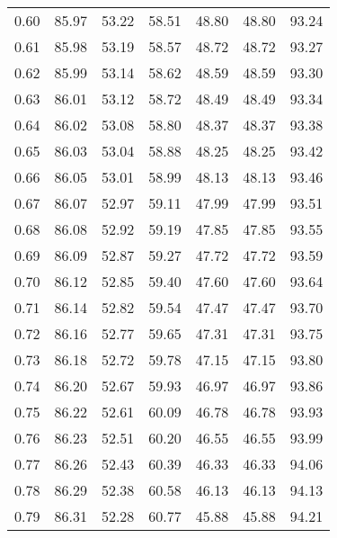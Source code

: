 \begin{tabular}{|c|c|c|c|c|c|c|}
      0.60 &     85.97 &     53.22 &      58.51 &   48.80 &      48.80 &         93.24 \\
      0.61 &     85.98 &     53.19 &      58.57 &   48.72 &      48.72 &         93.27 \\
      0.62 &     85.99 &     53.14 &      58.62 &   48.59 &      48.59 &         93.30 \\
      0.63 &     86.01 &     53.12 &      58.72 &   48.49 &      48.49 &         93.34 \\
      0.64 &     86.02 &     53.08 &      58.80 &   48.37 &      48.37 &         93.38 \\
      0.65 &     86.03 &     53.04 &      58.88 &   48.25 &      48.25 &         93.42 \\
      0.66 &     86.05 &     53.01 &      58.99 &   48.13 &      48.13 &         93.46 \\
      0.67 &     86.07 &     52.97 &      59.11 &   47.99 &      47.99 &         93.51 \\
      0.68 &     86.08 &     52.92 &      59.19 &   47.85 &      47.85 &         93.55 \\
      0.69 &     86.09 &     52.87 &      59.27 &   47.72 &      47.72 &         93.59 \\
      0.70 &     86.12 &     52.85 &      59.40 &   47.60 &      47.60 &         93.64 \\
      0.71 &     86.14 &     52.82 &      59.54 &   47.47 &      47.47 &         93.70 \\
      0.72 &     86.16 &     52.77 &      59.65 &   47.31 &      47.31 &         93.75 \\
      0.73 &     86.18 &     52.72 &      59.78 &   47.15 &      47.15 &         93.80 \\
      0.74 &     86.20 &     52.67 &      59.93 &   46.97 &      46.97 &         93.86 \\
      0.75 &     86.22 &     52.61 &      60.09 &   46.78 &      46.78 &         93.93 \\
      0.76 &     86.23 &     52.51 &      60.20 &   46.55 &      46.55 &         93.99 \\
      0.77 &     86.26 &     52.43 &      60.39 &   46.33 &      46.33 &         94.06 \\
      0.78 &     86.29 &     52.38 &      60.58 &   46.13 &      46.13 &         94.13 \\
      0.79 &     86.31 &     52.28 &      60.77 &   45.88 &      45.88 &         94.21 \\

\end{tabular}
